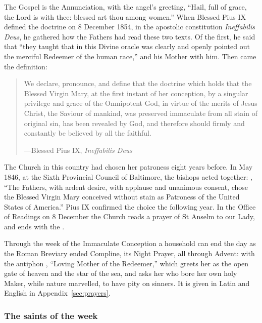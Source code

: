 \noindent The Gospel is the Annunciation, with the angel's greeting, ``Hail, full
of grace, the Lord is with thee: blessed art thou among women.'' When Blessed
Pius IX defined the doctrine on 8 December 1854, in the apostolic constitution
\emph{Ineffabilis Deus}, he gathered how the Fathers had read these two texts. Of the first, he
said that ``they taught that in this Divine oracle was clearly and openly
pointed out the merciful Redeemer of the human race,'' and his Mother with him.
Then came the definition:

\begin{quote}
We declare, pronounce, and define that the doctrine which holds that the Blessed
Virgin Mary, at the first instant of her conception, by a singular privilege and
grace of the Omnipotent God, in virtue of the merits of Jesus Christ, the
Saviour of mankind, was preserved immaculate from all stain of original sin, has
been revealed by God, and therefore should firmly and constantly be believed by
all the faithful.\par
{\smallskip\noindent\small ---Blessed Pius IX, \emph{Ineffabilis Deus}\par}
\end{quote}

The Church in this country had chosen her patroness eight years before. In May
1846, at the Sixth Provincial Council of Baltimore, the bishops acted
together: ,
``The Fathers, with ardent desire, with applause and unanimous consent, chose
the Blessed Virgin Mary conceived without stain as Patroness of the United States
of America.'' Pius IX confirmed the choice the following year. In the Office
of Readings on 8 December the Church reads a prayer of St Anselm to our Lady,
and ends with the .

Through the week of the Immaculate Conception a household can end the day as
the Roman Breviary ended Compline, its Night Prayer, all through Advent: with
the antiphon , ``Loving Mother of the Redeemer,''
which greets her as the open gate of heaven and the star of the sea, and asks
her who bore her own holy Maker, while nature marvelled, to have pity on
sinners. It is given in Latin and English in Appendix~\ref{sec:prayers}.

\subsubsection*{The saints of the week}

